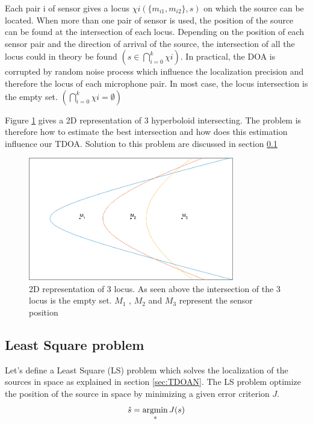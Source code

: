 \iffalse
Each pair i of sensor gives a locus $\chi{i}(\{m_{i1},m_{i2}\},s)$ on which the source can be located. When more than one pair of sensor is used, the position of the source can be found at the intersection of each locus. Depending on the position of each sensor pair and the direction of arrival of the source, the intersection of all the locus could in theory be found $ ( s\in {\bigcap}_{i=0}^k \chi{i} )$. In practical, the DOA is corrupted by random noise process which influence the localization precision and therefore the locus of each microphone pair. In most case, the locus intersection is the empty set. $ ( {\bigcap}_{i=0}^k \chi{i} = \emptyset ) $


Figure \ref{fig:hyperboloid_intersect} gives a 2D representation of 3 hyperboloid intersecting. The problem is therefore how to estimate the best intersection and how does this estimation influence our TDOA. Solution to this problem are discussed in section \ref{sec:LSTDOA}

\begin{figure}[H]
    \centering
    \includegraphics[width=0.8\textwidth]{Figures/intersect.png}
    \caption{2D representation of 3 locus. As seen above the intersection of the 3 locus is the empty set. $M_{1}$ , $M_{2}$ and $M_{3}$ represent the sensor position}
    \label{fig:hyperboloid_intersect}
\end{figure}

\subsection{Least Square problem}\label{sec:LSTDOA}

Let's define a Least Square (LS) problem which solves the localization of the sources in space as explained in section \ref{sec:TDOAN}. The LS problem optimize the position of the source in space by minimizing a given error criterion $ J $.
\begin{equation}
\hat{s}= \argmin_{s} J(s) 
\end{equation}

